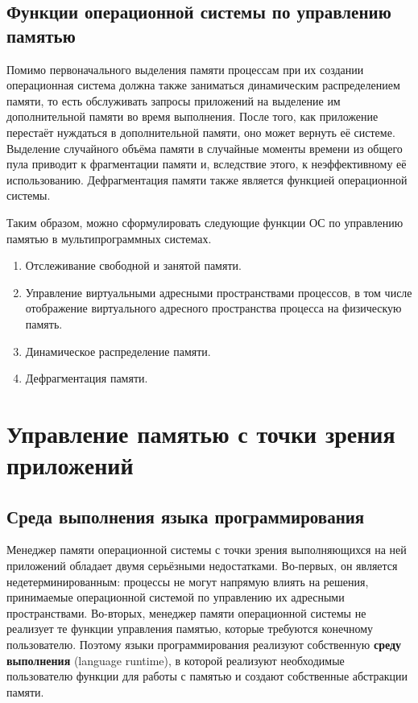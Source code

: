 \subsection{Функции операционной системы по управлению памятью}

Помимо первоначального выделения памяти процессам при их создании операционная система должна также заниматься динамическим распределением памяти, то есть обслуживать запросы приложений на выделение им дополнительной памяти во время выполнения. После того, как приложение перестаёт нуждаться в дополнительной памяти, оно может вернуть её системе. Выделение случайного объёма памяти в случайные моменты времени из общего пула приводит к фрагментации памяти и, вследствие этого, к неэффективному её использованию. Дефрагментация памяти также является функцией операционной системы.

Таким образом, можно сформулировать следующие функции ОС по управлению памятью в мультипрограммных системах.

\begin{enumerate}[label*=\arabic*.]
	\item Отслеживание свободной и занятой памяти.
	\item Управление виртуальными адресными пространствами процессов, в том числе отображение виртуального адресного пространства процесса на физическую память.
	\item Динамическое распределение памяти. 
	\item Дефрагментация памяти. 
\end{enumerate}


\section{Управление памятью с точки зрения приложений}

\subsection{Среда выполнения языка программирования}

Менеджер памяти операционной системы с точки зрения выполняющихся на ней приложений обладает двумя серьёзными недостатками. Во-первых, он является недетерминированным: процессы не могут напрямую влиять на решения, принимаемые операционной системой по управлению их адресными пространствами. Во-вторых, менеджер памяти операционной системы не реализует те функции управления памятью, которые требуются конечному пользователю. Поэтому языки программирования реализуют собственную \textbf{среду выполнения} (language runtime), в которой реализуют необходимые пользователю функции для работы с памятью и создают собственные абстракции памяти.

